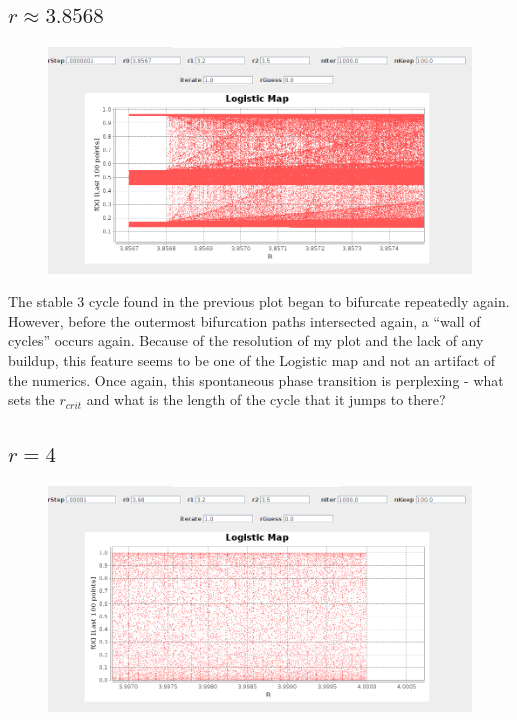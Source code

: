 \documentclass[aps,letterpaper,10pt]{article}
\begin{document}
\newpage
\subsection{$r\approx3.8568$}
\begin{figure}[!h]
\centering
\includegraphics[width=\textwidth]{../pictures/CoolPic3.png}
\label{fig:r3}
\end{figure}

The stable 3 cycle found in the previous plot began to bifurcate repeatedly again. However, before the outermost bifurcation paths intersected again, a ``wall of cycles'' occurs again. Because of the resolution of my plot and the lack of any buildup, this feature seems to be one of the Logistic map and not an artifact of the numerics. Once again, this spontaneous phase transition is perplexing - what sets the $r_{crit}$ and what is the length of the cycle that it jumps to there?

\subsection{$r=4$}
\begin{figure}[!h]
\centering
\includegraphics[width=\textwidth]{../pictures/CoolPic4.png}
\label{fig:r4}
\end{figure}
\end{document}

